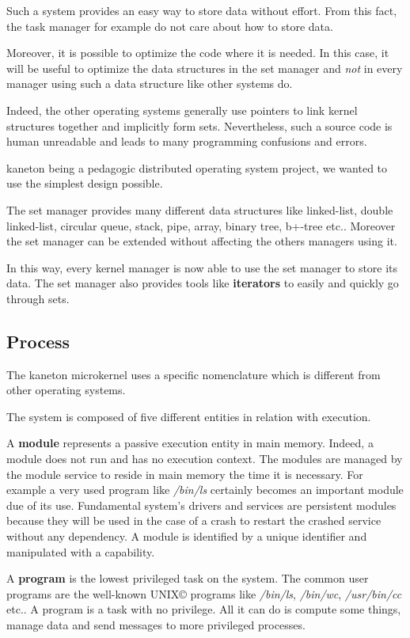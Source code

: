 \documentclass[10pt,a4wide]{article}
\begin{document}
\begin{multicols}{2}
Such a system provides an easy way to store data without effort. From this
fact, the task manager for example do not care about how to store data.

Moreover, it is possible to optimize the code where it is needed. In this
case, it will be useful to optimize the data structures in the set manager
and \textit{not} in every manager using such a data structure like
other systems do.

Indeed, the other operating systems generally use pointers to link kernel
structures together and implicitly form sets. Nevertheless, such a source code
is human unreadable and leads to many programming confusions and errors.

kaneton being a pedagogic distributed operating system project, we wanted
to use the simplest design possible.

The set manager provides many different data structures like linked-list,
double linked-list, circular queue, stack, pipe, array, binary tree, b+-tree
etc.. Moreover the set manager can be extended without affecting the others
managers using it.

In this way, every kernel manager is now able to use the set manager to
store its data. The set manager also provides tools like \textbf{iterators}
to easily and quickly go through sets.

\subsection{Process}

The kaneton microkernel uses a specific nomenclature which is different
from other operating systems.

The system is composed of five different entities in relation with execution.

A \textbf{module} represents a passive execution entity in main memory.
Indeed, a module does not run and has no execution context. The modules are
managed by the module service to reside in main memory the time it is
necessary. For example a very used program like \textit{/bin/ls} certainly
becomes an important module due of its use. Fundamental system's drivers
and services are persistent modules because they will be used in the case
of a crash to restart the crashed service without any dependency.
A module is identified by a unique identifier and manipulated with a
capability.

A \textbf{program} is the lowest privileged task on the system.
The common user programs are the well-known UNIX{\scriptsize \copyright}
programs like \textit{/bin/ls}, \textit{/bin/wc}, \textit{/usr/bin/cc} etc..
A program is a task with no privilege. All it can do is compute some things,
manage data and send messages to more privileged processes.


\end{multicols}
\end{document}
